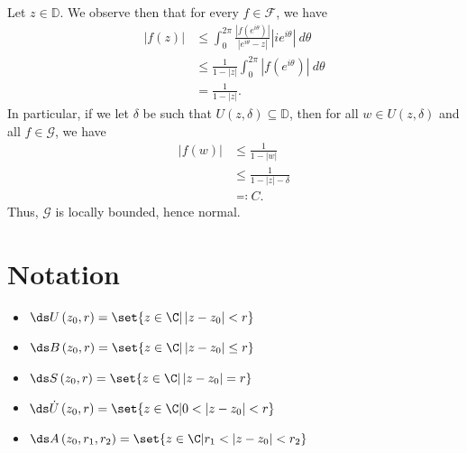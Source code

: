 \documentclass[10pt]{mypackage}
\renewcommand{\D}{\mathbb{D}}
\begin{document}
\begin{solution}
  Let $z\in \D$. We observe then that for every $f\in \mathcal{F}$, we have
  \begin{align*}
    \left\vert f(z) \right\vert &\leq \int_{0}^{2\pi} \frac{\left\vert f\left( e^{i\theta} \right) \right\vert}{\left\vert e^{i\theta}-z \right\vert}\left\vert ie^{i\theta} \right\vert\:d\theta\\
                                &\leq \frac{1}{1-\left\vert z \right\vert} \int_{0}^{2\pi} \left\vert f\left( e^{i\theta} \right) \right\vert\:d\theta\\
                                &= \frac{1}{1-\left\vert z \right\vert}.
  \end{align*}
  In particular, if we let $\delta$ be such that $U\left( z,\delta \right)\subseteq \D$, then for all $w\in U\left( z,\delta \right)$ and all $f\in \mathcal{G}$, we have
  \begin{align*}
    \left\vert f(w) \right\vert &\leq \frac{1}{1-\left\vert w \right\vert}\\
                                &\leq \frac{1}{1-\left\vert z \right\vert-\delta}\\
                                &\eqcolon C.
  \end{align*}
  Thus, $\mathcal{G}$ is locally bounded, hence normal.
\end{solution}

\section{Notation}%
\begin{itemize}
  \item $\ds U\left( z_0,r \right) = \set{z\in \C | \left\vert z-z_0 \right\vert < r}$
  \item $\ds B\left( z_0,r \right) = \set{z\in \C | \left\vert z-z_0 \right\vert \leq r}$
  \item $\ds S\left( z_0,r \right) = \set{z\in \C | \left\vert z-z_0 \right\vert = r}$
  \item $\ds \dot{U}\left( z_0,r \right) = \set{z\in \C | 0 < \left\vert z-z_0 \right\vert < r}$
  \item $\ds A\left( z_0,r_1,r_2 \right) = \set{z\in \C | r_1 < \left\vert z-z_0 \right\vert < r_2}$
\end{itemize}
\end{document}
